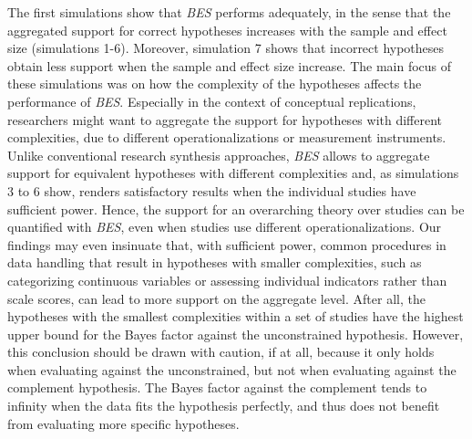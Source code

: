 \documentclass[
]{article}
\begin{document}
The first simulations show that \emph{BES} performs adequately, in the
sense that the aggregated support for correct hypotheses increases with
the sample and effect size (simulations 1-6). Moreover, simulation 7
shows that incorrect hypotheses obtain less support when the sample and
effect size increase. The main focus of these simulations was on how the
complexity of the hypotheses affects the performance of \emph{BES}.
Especially in the context of conceptual replications, researchers might
want to aggregate the support for hypotheses with different
complexities, due to different operationalizations or measurement
instruments. Unlike conventional research synthesis approaches,
\emph{BES} allows to aggregate support for equivalent hypotheses with
different complexities and, as simulations 3 to 6 show, renders
satisfactory results when the individual studies have sufficient power.
Hence, the support for an overarching theory over studies can be
quantified with \emph{BES}, even when studies use different
operationalizations. Our findings may even insinuate that, with
sufficient power, common procedures in data handling that result in
hypotheses with smaller complexities, such as categorizing continuous
variables or assessing individual indicators rather than scale scores,
can lead to more support on the aggregate level. After all, the
hypotheses with the smallest complexities within a set of studies have
the highest upper bound for the Bayes factor against the unconstrained
hypothesis. However, this conclusion should be drawn with caution, if at
all, because it only holds when evaluating against the unconstrained,
but not when evaluating against the complement hypothesis. The Bayes
factor against the complement tends to infinity when the data fits the
hypothesis perfectly, and thus does not benefit from evaluating more
specific hypotheses.
\end{document}
